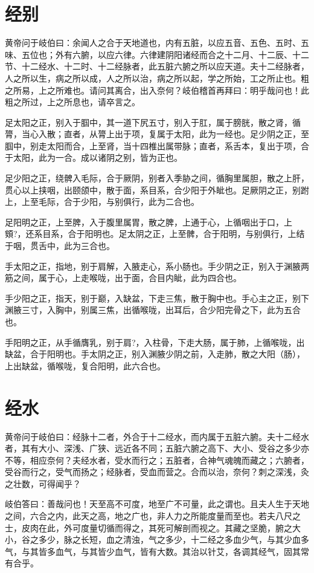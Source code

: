 \documentclass[a4paper,12pt,UTF8,twoside]{ctexbook}
\begin{document}
	\chapter{经别}
	
	黄帝问于岐伯曰：余闻人之合于天地道也，内有五脏，以应五音、五色、五时、五味、五位也；外有六腑，以应六律。六律建阴阳诸经而合之十二月、十二辰、十二节、十二经水、十二时、十二经脉者，此五脏六腑之所以应天道。夫十二经脉者，人之所以生，病之所以成，人之所以治，病之所以起，学之所始，工之所止也。粗之所易，上之所难也。请问其离合，出入奈何？岐伯稽首再拜曰：明乎哉问也！此粗之所过，上之所息也，请卒言之。
	
	足太阳之正，别入于腘中，其一道下尻五寸，别入于肛，属于膀胱，散之肾，循膂，当心入散；直者，从膂上出于项，复属于太阳，此为一经也。足少阴之正，至腘中，别走太阳而合，上至肾，当十四椎出属带脉；直者，系舌本，复出于项，合于太阳，此为一合。成以诸阴之别，皆为正也。
	
	足少阳之正，绕髀入毛际，合于厥阴，别者入季胁之间，循胸里属胆，散之上肝，贯心以上挟咽，出颐颌中，散于面，系目系，合少阳于外眦也。足厥阴之正，别跗上，上至毛际，合于少阳，与别俱行，此为二合也。
	
	足阳明之正，上至脾，入于腹里属胃，散之脾，上通于心，上循咽出于口，上頞?，还系目系，合于阳明也。足太阴之正，上至髀，合于阳明，与别俱行，上结于咽，贯舌中，此为三合也。
	
	手太阳之正，指地，别于肩解，入腋走心，系小肠也。手少阴之正，别入于渊腋两筋之间，属于心，上走喉咙，出于面，合目内眦，此为四合也。
	
	手少阳之正，指天，别于巅，入缺盆，下走三焦，散于胸中也。手心主之正，别下渊腋三寸，入胸中，别属三焦，出循喉咙，出耳后，合少阳完骨之下，此为五合也。
	
	手阳明之正，从手循膺乳，别于肩?，入柱骨，下走大肠，属于肺，上循喉咙，出缺盆，合于阳明也。手太阴之正，别入渊腋少阴之前，入走肺，散之大阳（肠），上出缺盆，循喉咙，复合阳明，此六合也。
	\chapter{经水}
	
	黄帝问于岐伯曰：经脉十二者，外合于十二经水，而内属于五脏六腑。夫十二经水者，其有大小、深浅、广狭、远近各不同；五脏六腑之高下、大小、受谷之多少亦不等，相应奈何？夫经水者，受水而行之；五脏者，合神气魂魄而藏之；六腑者，受谷而行之，受气而扬之；经脉者，受血而营之。合而以治，奈何？刺之深浅，灸之壮数，可得闻乎？
	
	岐伯答曰：善哉问也！天至高不可度，地至广不可量，此之谓也。且夫人生于天地之间，六合之内，此天之高，地之广也，非人力之所能度量而至也。若夫八尺之士，皮肉在此，外可度量切循而得之，其死可解剖而视之。其藏之坚脆，腑之大小，谷之多少，脉之长短，血之清浊，气之多少，十二经之多血少气，与其少血多气，与其皆多血气，与其皆少血气，皆有大数。其治以针艾，各调其经气，固其常有合乎。
	
\end{document}
